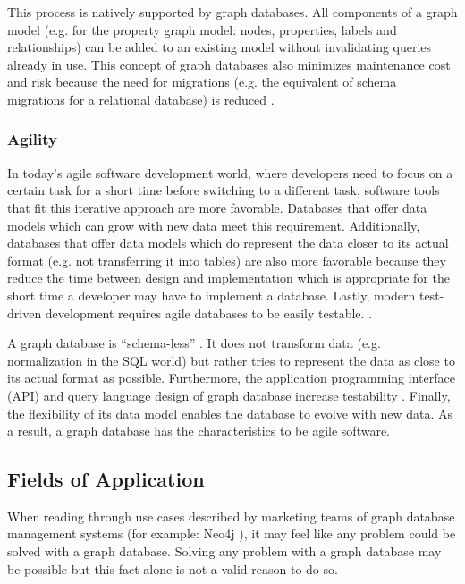 This process is natively supported by graph databases. All components of a graph model (e.g. for the property graph model: nodes, properties, labels and relationships) can be added to an existing model without invalidating queries already in use. This concept of graph databases also minimizes maintenance cost and risk because the need for migrations (e.g. the equivalent of schema migrations for a relational database) is reduced \autocite{maheshlal2015, graphdb2015}.

\subsubsection{Agility}
In today's agile software development world, where developers need to focus on a certain task for a short time before switching to a different task, software tools that fit this iterative approach are more favorable. Databases that offer data models which can grow with new data meet this requirement. Additionally, databases that offer data models which do represent the data closer to its actual format (e.g. not transferring it into tables) are also more favorable because they reduce the time between design and implementation which is appropriate for the short time a developer may have to implement a database. Lastly, modern test-driven development requires agile databases to be easily testable. \autocite{maheshlal2015, graphdb2015}.

A graph database is “schema-less” \autocite{maheshlal2015}. It does not transform data (e.g. normalization in the SQL world) but rather tries to represent the data as close to its actual format as possible. Furthermore, the application programming interface (API) and query language design of graph database increase testability \autocite{graphdb2015} . Finally, the flexibility of its data model enables the database to evolve with new data. As a result, a graph database has the characteristics to be agile software.

\subsection{Fields of Application} \label{section:FoA}
When reading through use cases described by marketing teams of graph database management systems (for example: Neo4j \autocite{neo4j:why_graphdb, neo4j:use_cases}
), it may feel like any problem could be solved with a graph database. Solving any problem with a graph database may be possible but this fact alone is not a valid reason to do so.


